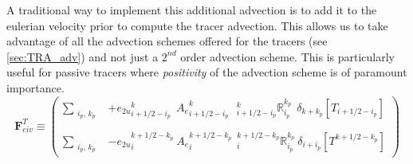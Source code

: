 \documentclass[../main/NEMO_manual]{subfiles}
\begin{document}
A traditional way to implement this additional advection is to add it to the eulerian velocity prior to
compute the tracer advection.
This allows us to take advantage of all the advection schemes offered for the tracers
(see \autoref{sec:TRA_adv}) and not just a $2^{nd}$ order advection scheme.
This is particularly useful for passive tracers where
\emph{positivity} of the advection scheme is of paramount importance.
\[
  \textbf{F}_{eiv}^T   \equiv   \left(
    \begin{aligned}
      \sum_{\substack{i_p,\,k_p}} &
      +{e_{2u}}_{i+1/2-i_p}^{k}                                  \ \ {A_{e}}_{i+1/2-i_p}^{k}
      \ \ \ { _{i+1/2-i_p}^k \mathbb{R}_{i_p}^{k_p} }    \ \ \delta_{k+k_p}[T_{i+1/2-i_p}] \\ \\
      \sum_{\substack{i_p,\,k_p}} &
      - {e_{2u}}_i^{k+1/2-k_p}                                      \ {A_{e}}_i^{k+1/2-k_p}
      \ \ { _i^{k+1/2-k_p} \mathbb{R}_{i_p}^{k_p} }    \ \delta_{i+i_p}[T^{k+1/2-k_p}]
    \end{aligned}
  \right)
\]
\end{document}
